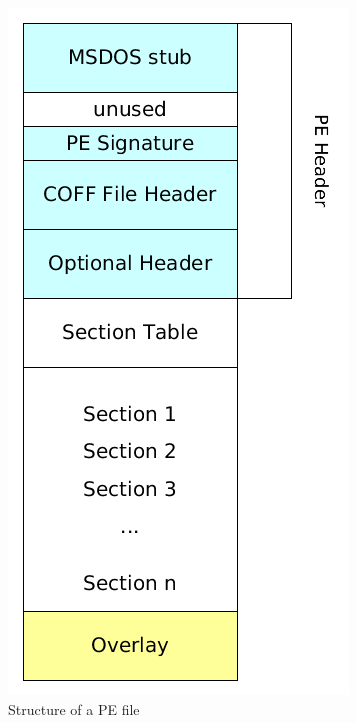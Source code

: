 \begin{figure}
\centering
\includegraphics[width=.98\textwidth, height=.60\textheight,keepaspectratio]{graphics/peformat}
\caption{Structure of a PE file}
\label{fig:peformat} 
\end{figure}

